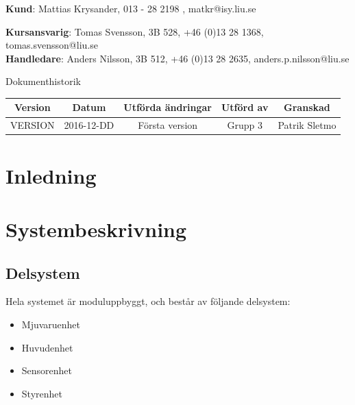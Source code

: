 \documentclass{article}
\begin{document}
\begin{center}
\textbf{Kund}: Mattias Krysander, 013 - 28 2198 , matkr@isy.liu.se
\end{center}

\begin{center}
\textbf{Kursansvarig}: Tomas Svensson, 3B 528, +46 (0)13 28 1368, tomas.svensson@liu.se \\
\textbf{Handledare}: Anders Nilsson, 3B 512, +46 (0)13 28 2635, anders.p.nilsson@liu.se
\end{center}
\vspace*{\fill}
\clearpage

\renewcommand*\contentsname{Innehållsförteckning}
\tableofcontents
\clearpage


{
\sffamily
\centering
\large


{\huge 
Dokumenthistorik \\
}
\begin{table}[H]
\centering
\begin{tabular}{ | c | c | c | c | c |} 
\hline
\textbf{Version} & \textbf{Datum} & \textbf{Utförda ändringar} & \textbf{Utförd av } & \textbf{Granskad} \\
\hline
VERSION & 2016-12-DD & Första version & Grupp 3 & Patrik Sletmo \\
\hline

\end{tabular}
\end{table}
}

\section{Inledning}

\section{Systembeskrivning}

\subsection{Delsystem}
Hela systemet är moduluppbyggt, och består av följande delsystem:
\begin{itemize}
\item Mjuvaruenhet
\item Huvudenhet
\item Sensorenhet
\item Styrenhet
\end{itemize}
\end{document}
